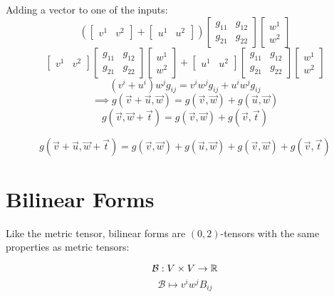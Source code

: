 \documentclass{report}
\begin{document}
Adding a vector to one of the inputs:
$$ \left( \begin{bmatrix} v^1 & v^2 \end{bmatrix} + \begin{bmatrix} u^1 & u^2 \end{bmatrix}  \right) \begin{bmatrix} g_{11} & g_{12}\\ g_{21} & g_{22} \end{bmatrix} \begin{bmatrix} w^1 \\ w^2 \end{bmatrix}  $$ 
$$ \begin{bmatrix} v^1 & v^2 \end{bmatrix}   \begin{bmatrix} g_{11} & g_{12}\\ g_{21} & g_{22} \end{bmatrix} \begin{bmatrix} w^1 \\ w^2 \end{bmatrix} + \begin{bmatrix} u^1 & u^2 \end{bmatrix}   \begin{bmatrix} g_{11} & g_{12}\\ g_{21} & g_{22} \end{bmatrix} \begin{bmatrix} w^1 \\ w^2 \end{bmatrix} $$ 
$$ \left( v^i + u^i \right) w^j g_{ij} = v^i w^j g_{ij} + u^i w^j g_{ij} $$ 
$$ \implies g\left(\vec{v}+\vec{u}, \vec{w}\right) = g(\vec{v}, \vec{w}) + g(\vec{u}, \vec{w}) $$ 
$$ g\left(\vec{v}, \vec{w} + \vec{t}\right) = g\left(\vec{v}, \vec{w}\right)  + g\left(\vec{v}, \vec{t} \right) $$ 

$$ g\left(\vec{v} + \vec{u}, \vec{w} + \vec{t}\right) = g\left(\vec{v}, \vec{w}\right) + g\left( \vec{u}, \vec{w} \right) + g\left( \vec{v}, \vec{w} \right) + g\left( \vec{v}, \vec{t} \right) $$ 

\section{Bilinear Forms}
Like the metric tensor, bilinear forms are $(0, 2)$-tensors with the same properties as metric tensors:

$$\mathcal{B}: V \times V \to \R $$ 
$$ \mathcal{B} \mapsto v^i w^j B_{ij} $$ 
\end{document}
